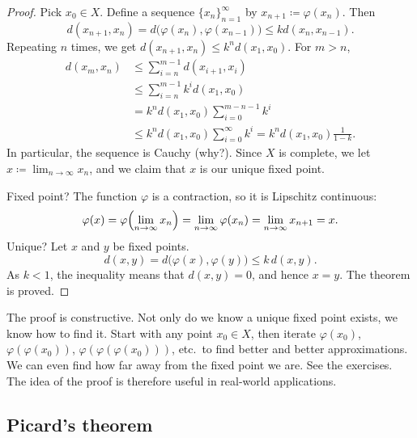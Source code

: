 \begin{proof}
Pick $x_0 \in X$.
Define a sequence $\{ x_n \}_{n=1}^\infty$ by $x_{n+1} \coloneqq \varphi(x_n)$.  Then
\begin{equation*}
d(x_{n+1},x_n) = d\bigl(\varphi(x_n),\varphi(x_{n-1})\bigr)
\leq k d(x_n,x_{n-1}) .
\end{equation*}
Repeating $n$ times, we get $d(x_{n+1},x_n) \leq k^n d(x_1,x_0)$.
For $m > n$,
\begin{equation*}
\begin{split}
d(x_m,x_n)
& \leq \sum_{i=n}^{m-1} d(x_{i+1},x_i) \\
& \leq \sum_{i=n}^{m-1} k^i d(x_1,x_0) \\
& = k^n d(x_1,x_0) \sum_{i=0}^{m-n-1} k^i \\
& \leq k^n d(x_1,x_0) \sum_{i=0}^{\infty} k^i
= k^n d(x_1,x_0) \frac{1}{1-k} .
\end{split}
\end{equation*}
In particular, the sequence is Cauchy (why?).  Since $X$ is complete,
we let $x \coloneqq \lim_{n\to\infty} x_n$, and we claim that $x$
is our unique fixed point.

Fixed point?  The function $\varphi$ is a contraction,
so it is Lipschitz continuous:
\begin{equation*}
\varphi(x) = \varphi\Bigl( \lim_{n\to\infty} x_n\Bigr) = \lim_{n\to\infty}
\varphi(x_n) =
\lim_{n\to\infty} x_{n+1} = x .
\end{equation*}
Unique?  Let $x$ and $y$ be fixed points.
\begin{equation*}
d(x,y) = d\bigl(\varphi(x),\varphi(y)\bigr) \leq k\, d(x,y) .
\end{equation*}
As $k < 1$, the inequality means that $d(x,y) = 0$, and hence $x=y$.  The theorem is
proved.
\end{proof}

The proof is constructive.  Not only do we know 
a unique fixed point exists, we know how to find it.  Start with
any point $x_0 \in X$, then iterate $\varphi(x_0)$,
$\varphi(\varphi(x_0))$,
$\varphi(\varphi(\varphi(x_0)))$, etc.\ to find better and better approximations.
We can even find how far away
from the fixed point we are.
See the exercises.  The idea of the proof is
therefore useful in real-world applications.

\subsection{Picard's theorem}

